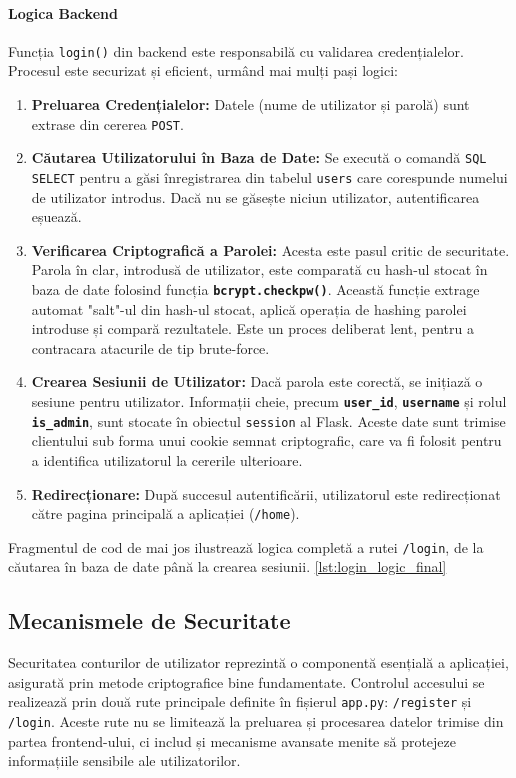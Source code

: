 \documentclass[12pt, a4paper, oneside, romanian]{teza-upb}
\begin{document}
\paragraph{Logica Backend}
Funcția \texttt{login()} din backend este responsabilă cu validarea credențialelor. Procesul este securizat și eficient, urmând mai mulți pași logici:
\begin{enumerate}
	\item \textbf{Preluarea Credențialelor:} Datele (nume de utilizator și parolă) sunt extrase din cererea \texttt{POST}.
	
	\item \textbf{Căutarea Utilizatorului în Baza de Date:} Se execută o comandă \texttt{SQL SELECT} pentru a găsi înregistrarea din tabelul \texttt{users} care corespunde numelui de utilizator introdus. Dacă nu se găsește niciun utilizator, autentificarea eșuează.
	
	\item \textbf{Verificarea Criptografică a Parolei:} Acesta este pasul critic de securitate. Parola în clar, introdusă de utilizator, este comparată cu hash-ul stocat în baza de date folosind funcția \textbf{\texttt{bcrypt.checkpw()}}. Această funcție extrage automat "salt"-ul din hash-ul stocat, aplică operația de hashing parolei introduse și compară rezultatele. Este un proces deliberat lent, pentru a contracara atacurile de tip brute-force.
	
	\item \textbf{Crearea Sesiunii de Utilizator:} Dacă parola este corectă, se inițiază o sesiune pentru utilizator. Informații cheie, precum \textbf{\texttt{user\_id}}, \textbf{\texttt{username}} și rolul \textbf{\texttt{is\_admin}}, sunt stocate în obiectul \texttt{session} al Flask. Aceste date sunt trimise clientului sub forma unui cookie semnat criptografic, care va fi folosit pentru a identifica utilizatorul la cererile ulterioare.
	
	\item \textbf{Redirecționare:} După succesul autentificării, utilizatorul este redirecționat către pagina principală a aplicației (\texttt{/home}).
\end{enumerate}


Fragmentul de cod de mai jos ilustrează logica completă a rutei \texttt{/login}, de la căutarea în baza de date până la crearea sesiunii. \ref{lst:login_logic_final}



\subsection{Mecanismele de Securitate}
Securitatea conturilor de utilizator reprezintă o componentă esențială a aplicației, asigurată prin metode criptografice bine fundamentate. Controlul accesului se realizează prin două rute principale definite în fișierul \texttt{app.py}: \texttt{/register} și \texttt{/login}. Aceste rute nu se limitează la preluarea și procesarea datelor trimise din partea frontend-ului, ci includ și mecanisme avansate menite să protejeze informațiile sensibile ale utilizatorilor.
\end{document}
